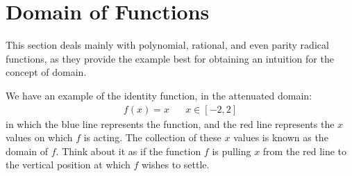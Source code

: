 \section{Domain of Functions}

This section deals mainly with polynomial, rational, and even parity radical functions, as they provide the example best for obtaining an intuition for the concept of domain.

\begin{example}
We have an example of the identity function, in the attenuated domain:
\begin{align*}
    f(x) = x \hspace{20pt} x \in [-2, 2]
\end{align*}
in which the blue line represents the function, and the red line represents the $x$ values on which $f$ is acting. The collection of these $x$ values is known as the domain of $f$. Think about it as if the function $f$ is pulling $x$ from the red line to the vertical position at which $f$ wishes to settle. 

\vspace{0.5in}
\end{example}


